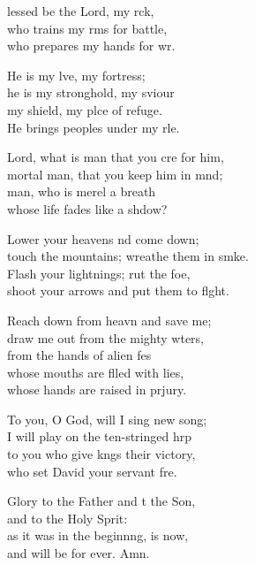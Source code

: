 \settowidth{\versewidth}{touch the mountains; wreathe them in smoke.}
\begin{psalmverse}%
  \begin{patverse}
lessed be the Lord, my rck,\Flex\\
who trains my rms for battle,\Med\\
who prepares my hands for wr.

He is my lve, my fortress;\Med\\
he is my stronghold, my sviour\\
my shield, my plce of refuge.\Med\\
He brings peoples under my rle.

Lord, what is man that you cre for him,\Med\\
mortal man, that you keep him in m\pointup{\i}nd;\\
man, who is merel a breath\Med\\
whose life fades like a shdow?

Lower your heavens nd come down;\Med\\
touch the mountains; wreathe them in smke.\\
Flash your lightnings; rut the foe,\Med\\
shoot your arrows and put them to fl\pointup{\i}ght.

Reach down from heavn and save me;\Med\\
draw me out from the mighty wters,\\
from the hands of alien fes\Flex\\
whose mouths are f\pointup{\i}lled with lies,\Med\\
whose hands are raised in prjury.

To you, O God, will I sing  new song;\Med\\
I will play on the ten-stringed hrp\\
to you who give k\pointup{\i}ngs their victory,\Med\\
who set David your servant fre.

Glory to the Father and t the Son,\Med\\
and to the Holy Sp\pointup{\i}rit:\\
as it was in the beginn\pointup{\i}ng, is now,\Med\\
and will be for ever. Amn.
  \end{patverse}
\end{psalmverse}
\setlength{\leftmargini}{\defleftmargini}  %
